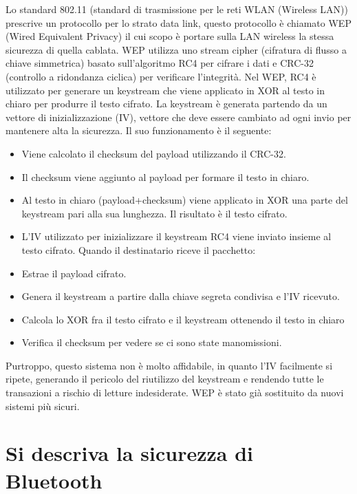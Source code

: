 Lo standard 802.11 (standard di trasmissione per le reti WLAN (Wireless LAN)) prescrive un protocollo per lo strato data link, questo protocollo è chiamato WEP (Wired Equivalent Privacy) il cui scopo è portare sulla LAN wireless la stessa sicurezza di quella cablata.
WEP utilizza uno stream cipher (cifratura di flusso a chiave simmetrica) basato sull’algoritmo RC4 per cifrare i dati e CRC-32 (controllo a ridondanza ciclica) per verificare l’integrità.
Nel WEP, RC4 è utilizzato per generare un keystream che viene applicato in XOR al testo in chiaro per produrre il testo cifrato. La keystream è generata partendo da un vettore di inizializzazione (IV), vettore che deve essere cambiato ad ogni invio per mantenere alta la sicurezza.
Il suo funzionamento è il seguente:
\begin{itemize}
\item	Viene calcolato il checksum del payload utilizzando il CRC-32.
\item	Il checksum viene aggiunto al payload per formare il testo in chiaro.
\item	Al testo in chiaro (payload+checksum) viene applicato in XOR una parte del keystream pari alla sua lunghezza. Il risultato è il testo cifrato.
\item	L’IV utilizzato per inizializzare il keystream RC4 viene inviato insieme al testo cifrato.
Quando il destinatario riceve il pacchetto:
\item	Estrae il payload cifrato.
\item	Genera il keystream a partire dalla chiave segreta condivisa e l’IV ricevuto.
\item	Calcola lo XOR fra il testo cifrato e il keystream ottenendo il testo in chiaro
\item	Verifica il checksum per vedere se ci sono state manomissioni.
\end{itemize}
Purtroppo, questo sistema non è molto affidabile, in quanto l’IV facilmente si ripete, generando il pericolo del riutilizzo del keystream e rendendo tutte le transazioni a rischio di letture indesiderate. WEP è stato già sostituito da nuovi sistemi più sicuri.
\section{Si descriva la sicurezza di Bluetooth}

